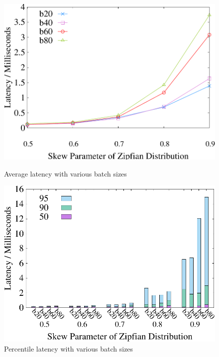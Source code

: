 \begin{figure}[t]
    \centering
    \begin{minipage}[b]{0.32\linewidth}
    	\centering
    	\includegraphics[width=\textwidth]{./exp_fig/bsize/latency}
    	\vspace{-2em}
    	\caption{Average latency with various batch sizes}
    	\label{fig:bsize:latency}
    \end{minipage}
    \begin{minipage}[b]{0.32\linewidth}
	\centering
	\includegraphics[width=\textwidth]{./exp_fig/bsize/percent95_latency}
	\vspace{-2em}
	\caption{Percentile latency with various batch sizes}
	\label{fig:bsize:p95}
	\end{minipage}

\end{figure}
